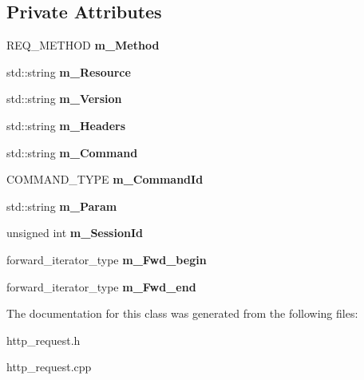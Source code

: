 \subsection*{Private Attributes}
\begin{DoxyCompactItemize}
\item 
\hypertarget{classhttp__server_1_1cRequest_a4702912c2025f7ce153f9ac68567b55c}{R\-E\-Q\-\_\-\-M\-E\-T\-H\-O\-D {\bfseries m\-\_\-\-Method}}\label{classhttp__server_1_1cRequest_a4702912c2025f7ce153f9ac68567b55c}

\item 
\hypertarget{classhttp__server_1_1cRequest_a4bd223196a1aa78de6ff2de4202232fa}{std\-::string {\bfseries m\-\_\-\-Resource}}\label{classhttp__server_1_1cRequest_a4bd223196a1aa78de6ff2de4202232fa}

\item 
\hypertarget{classhttp__server_1_1cRequest_ab64ead387c97768aabc1bed343731153}{std\-::string {\bfseries m\-\_\-\-Version}}\label{classhttp__server_1_1cRequest_ab64ead387c97768aabc1bed343731153}

\item 
\hypertarget{classhttp__server_1_1cRequest_aa1e6a65858e9cf26432add99470e4104}{std\-::string {\bfseries m\-\_\-\-Headers}}\label{classhttp__server_1_1cRequest_aa1e6a65858e9cf26432add99470e4104}

\item 
\hypertarget{classhttp__server_1_1cRequest_a52a8b99a07483daae11880a62e31ea4a}{std\-::string {\bfseries m\-\_\-\-Command}}\label{classhttp__server_1_1cRequest_a52a8b99a07483daae11880a62e31ea4a}

\item 
\hypertarget{classhttp__server_1_1cRequest_a2481a39733ba13124de865b30598a310}{C\-O\-M\-M\-A\-N\-D\-\_\-\-T\-Y\-P\-E {\bfseries m\-\_\-\-Command\-Id}}\label{classhttp__server_1_1cRequest_a2481a39733ba13124de865b30598a310}

\item 
\hypertarget{classhttp__server_1_1cRequest_a5320d5862827483c3f72c4fb385bcb16}{std\-::string {\bfseries m\-\_\-\-Param}}\label{classhttp__server_1_1cRequest_a5320d5862827483c3f72c4fb385bcb16}

\item 
\hypertarget{classhttp__server_1_1cRequest_a9c32df40a547799225a5ec41099fde53}{unsigned int {\bfseries m\-\_\-\-Session\-Id}}\label{classhttp__server_1_1cRequest_a9c32df40a547799225a5ec41099fde53}

\item 
\hypertarget{classhttp__server_1_1cRequest_a346ff4a99509f28178aa3702a877d438}{forward\-\_\-iterator\-\_\-type {\bfseries m\-\_\-\-Fwd\-\_\-begin}}\label{classhttp__server_1_1cRequest_a346ff4a99509f28178aa3702a877d438}

\item 
\hypertarget{classhttp__server_1_1cRequest_ad9fb0f78ed6fca01cdcdc6b3b01ba519}{forward\-\_\-iterator\-\_\-type {\bfseries m\-\_\-\-Fwd\-\_\-end}}\label{classhttp__server_1_1cRequest_ad9fb0f78ed6fca01cdcdc6b3b01ba519}

\end{DoxyCompactItemize}


The documentation for this class was generated from the following files\-:\begin{DoxyCompactItemize}
\item 
http\-\_\-request.\-h\item 
http\-\_\-request.\-cpp\end{DoxyCompactItemize}
